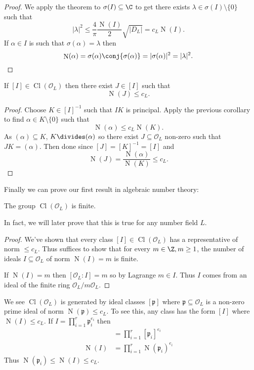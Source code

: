 \documentclass[a4paper]{article}
\renewcommand*{\O}{\mathcal{O}}
\DeclareMathOperator{\n}{N}
\DeclareMathOperator{\Cl}{Cl}%
\begin{document}
\begin{proof}
  We apply the theorem to \(\sigma(I) \subseteq \C\) to get there exists \(\lambda \in \sigma(I) \setminus \{0\}\) such that
  \[
    |\lambda|^2 \leq \frac{4}{\pi} \frac{\n(I)}{2} \sqrt{|D_L|} = c_L \n(I).
  \]
  If \(\alpha \in I\) is such that \(\sigma(\alpha) = \lambda\) then
  \[
    \n(\alpha)
    = \sigma(\alpha) \conj{\sigma(\alpha)}
    = |\sigma(\alpha)|^2
    = |\lambda|^2.
  \]
\end{proof}

\begin{corollary}
  If \([I] \in \Cl(\O_L)\) then there exist \(J \in [I]\) such that
  \[
    \n(J) \leq c_L.
  \]
\end{corollary}

\begin{proof}
  Choose \(K \in [I]^{-1}\) such that \(IK\) is principal. Apply the previous corollary to find \(\alpha \in K \setminus \{0\}\) such that
  \[
    \n(\alpha) \leq c_L \n(K).
  \]
  As \((\alpha) \subseteq K\), \(K \divides (\alpha)\) so there exist \(J \subseteq \O_L\) non-zero such that \(JK = (\alpha)\). Then done since \([J] = [K]^{-1} = [I]\) and
  \[
    \n(J) = \frac{\n(\alpha)}{\n(K)} \leq c_L.
  \]
\end{proof}

Finally we can prove our first result in algebraic number theory:

\begin{theorem}
  The group \(\Cl(\O_L)\) is finite.
\end{theorem}

In fact, we will later prove that this is true for any number field \(L\).

\begin{proof}
  We've shown that every class \([I] \in \Cl(\O_L)\) has a representative of norm \(\leq c_L\). Thus suffices to show that for every \(m \in \Z, m \geq 1\), the number of ideals \(I \subseteq \O_L\) of norm \(\n(I) = m\) is finite.

  If \(\n(I) = m\) then \([\O_L:I] = m\) so by Lagrange \(m \in I\). Thus \(I\) comes from an ideal of the finite ring \(\O_L/m\O_L\).
\end{proof}

\begin{note}
  We see \(\Cl(\O_L)\) is generated by ideal classes \([\mathfrak p]\) where \(\mathfrak p \subseteq \O_L\) is a non-zero prime ideal of norm \(\n(\mathfrak p) \leq c_L\). To see this, any class has the form \([I]\) where \(\n(I) \leq c_L\). If \(I = \prod_{i = 1}^r \mathfrak p_i^{e_i}\) then
  \begin{align*}
    [I] &= \prod_{i = 1}^r [\mathfrak p_i]^{e_i} \\
    \n(I) &= \prod_{i = 1}^r \n(\mathfrak p_i)^{e_i}
  \end{align*}
  Thus \(\n(\mathfrak p_i) \leq \n(I) \leq c_L\).
\end{note}
\end{document}
